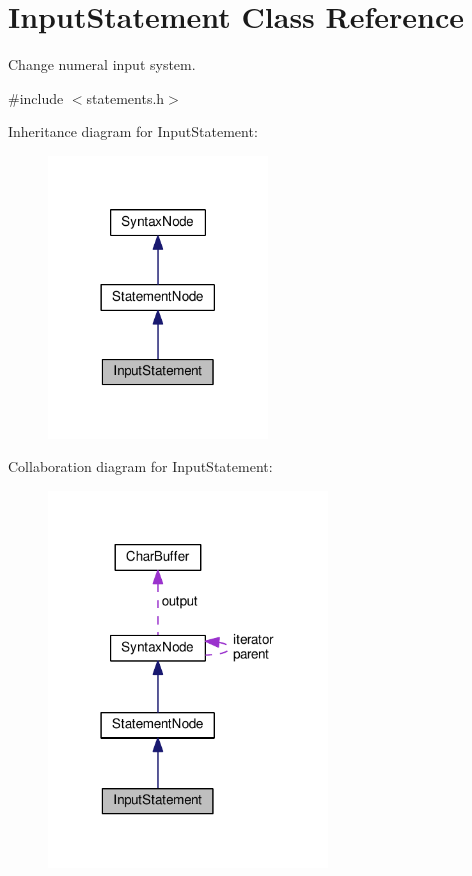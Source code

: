 \hypertarget{classInputStatement}{}\section{Input\+Statement Class Reference}
\label{classInputStatement}


Change numeral input system.  




{\ttfamily \#include $<$statements.\+h$>$}



Inheritance diagram for Input\+Statement\+:\nopagebreak
\begin{figure}[H]
\begin{center}
\leavevmode
\includegraphics[width=165pt]{classInputStatement__inherit__graph}
\end{center}
\end{figure}


Collaboration diagram for Input\+Statement\+:\nopagebreak
\begin{figure}[H]
\begin{center}
\leavevmode
\includegraphics[width=210pt]{classInputStatement__coll__graph}
\end{center}
\end{figure}
